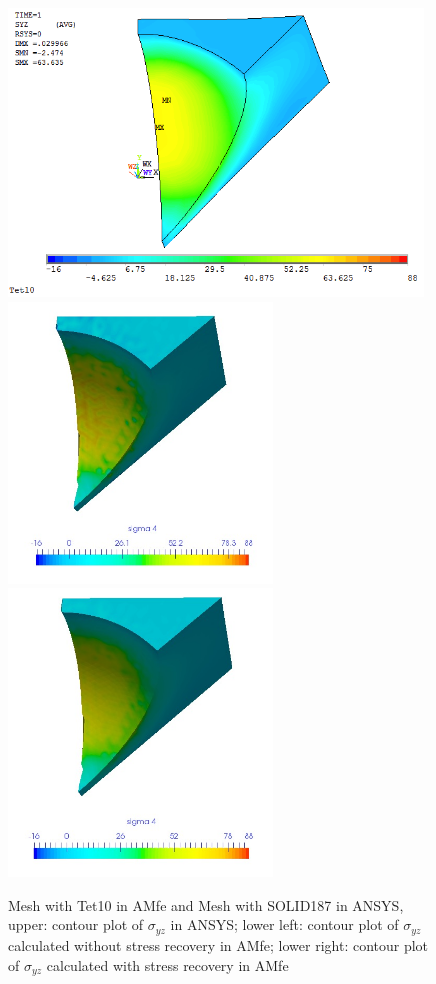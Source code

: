 \begin{figure}[htbp]
	\begin{center}
		\includegraphics[width=11cm,clip]{Tet10_Syz.png} 		
		\includegraphics[width=7cm,clip]{Tet10_Syz_PD.png} 		
		\includegraphics[width=7cm,clip]{Tet10_Syz_P.png} 		
		\caption{Mesh with Tet10 in AMfe and Mesh with SOLID187 in ANSYS, upper: contour plot of $\sigma_{yz}$ in ANSYS; lower left: contour plot of $\sigma_{yz}$ calculated without stress recovery in AMfe; lower right: contour plot of $\sigma_{yz}$ calculated with stress recovery in AMfe} \label{fig: Tet10_Syz}
	\end{center}
\end{figure}
\clearpage 

